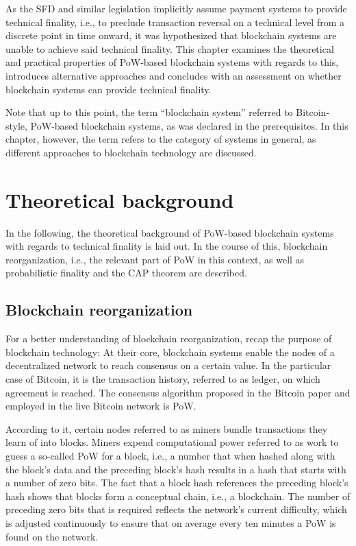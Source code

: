 As the SFD and similar legislation implicitly assume payment systems to provide technical finality, i.e., to preclude transaction reversal on a technical level from a discrete point in time onward, it was hypothesized that blockchain systems are unable to achieve said technical finality.
This chapter examines the theoretical and practical properties of PoW-based blockchain systems with regards to this, introduces alternative approaches and concludes with an assessment on whether blockchain systems can provide technical finality.

Note that up to this point, the term ``blockchain system'' referred to Bitcoin-style, PoW-based blockchain systems, as was declared in the prerequisites.
In this chapter, however, the term refers to the category of systems in general, as different approaches to blockchain technology are discussed.

\section{Theoretical background}

In the following, the theoretical background of PoW-based blockchain systems with regards to technical finality is laid out.
In the course of this, blockchain reorganization, i.e., the relevant part of PoW in this context, as well as probabilistic finality and the CAP theorem are described.

\subsection{Blockchain reorganization}

For a better understanding of blockchain reorganization, recap the purpose of blockchain technology:
At their core, blockchain systems enable the nodes of a decentralized network to reach consensus on a certain value.
In the particular case of Bitcoin, it is the transaction history, referred to as ledger, on which agreement is reached.
The consensus algorithm proposed in the Bitcoin paper and employed in the live Bitcoin network is PoW.

According to it, certain nodes referred to as miners bundle transactions they learn of into blocks.
Miners expend computational power referred to as work to guess a so-called PoW for a block, i.e., a number that when hashed along with the block's data and the preceding block's hash results in a hash that starts with a number of zero bits.
The fact that a block hash references the preceding block's hash shows that blocks form a conceptual chain, i.e., a blockchain.
The number of preceding zero bits that is required reflects the network's current difficulty, which is adjusted continuously to ensure that on average every ten minutes a PoW is found on the network. 

